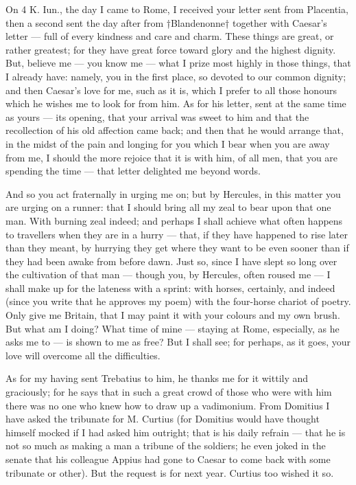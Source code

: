 

 On 4 K. Iun., the day I came to Rome, I received your letter sent from Placentia, then a second sent the day after from †Blandenonne† together with Caesar's letter — full of every kindness and care and charm. These things are great, or rather greatest; for they have great force toward glory and the highest dignity. But, believe me — you know me — what I prize most highly in those things, that I already have: namely, you in the first place, so devoted to our common dignity; and then Caesar's love for me, such as it is, which I prefer to all those honours which he wishes me to look for from him. As for his letter, sent at the same time as yours — its opening, that your arrival was sweet to him and that the recollection of his old affection came back; and then that he would arrange that, in the midst of the pain and longing for you which I bear when you are away from me, I should the more rejoice that it is with him, of all men, that you are spending the time — that letter delighted me beyond words.

 And so you act fraternally in urging me on; but by Hercules, in this matter you are urging on a runner: that I should bring all my zeal to bear upon that one man. With burning zeal indeed; and perhaps I shall achieve what often happens to travellers when they are in a hurry — that, if they have happened to rise later than they meant, by hurrying they get where they want to be even sooner than if they had been awake from before dawn. Just so, since I have slept so long over the cultivation of that man — though you, by Hercules, often roused me — I shall make up for the lateness with a sprint: with horses, certainly, and indeed (since you write that he approves my poem) with the four-horse chariot of poetry. Only give me Britain, that I may paint it with your colours and my own brush. But what am I doing? What time of mine — staying at Rome, especially, as he asks me to — is shown to me as free? But I shall see; for perhaps, as it goes, your love will overcome all the difficulties.

 As for my having sent Trebatius to him, he thanks me for it wittily and graciously; for he says that in such a great crowd of those who were with him there was no one who knew how to draw up a vadimonium. From Domitius I have asked the tribunate for M. Curtius (for Domitius would have thought himself mocked if I had asked him outright; that is his daily refrain — that he is not so much as making a man a tribune of the soldiers; he even joked in the senate that his colleague Appius had gone to Caesar to come back with some tribunate or other). But the request is for next year. Curtius too wished it so.

